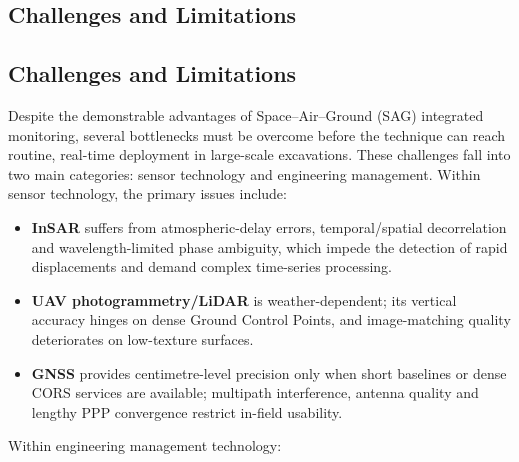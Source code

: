 \documentclass[preprint,11pt,authoryear,3p]{elsarticle}
\begin{document}
\subsection{Challenges and Limitations}

\subsection{Challenges and Limitations}\label{sec:challenges}

Despite the demonstrable advantages of Space--Air--Ground (SAG) integrated monitoring, several bottlenecks must be overcome before the technique can reach routine, real-time deployment in large-scale excavations. These challenges fall into two main categories: sensor technology and engineering management. Within sensor technology, the primary issues include:

\begin{itemize}
  \item \textbf{InSAR} suffers from atmospheric-delay errors, temporal/spatial decorrelation and wavelength-limited phase ambiguity, which impede the detection of rapid displacements and demand complex time-series processing.
  \item \textbf{UAV photogrammetry/LiDAR} is weather-dependent; its vertical accuracy hinges on dense Ground Control Points, and image-matching quality deteriorates on low-texture surfaces.
  \item \textbf{GNSS} provides centimetre-level precision only when short baselines or dense CORS services are available; multipath interference, antenna quality and lengthy PPP convergence restrict in-field usability.
\end{itemize}

Within engineering management technology:
\end{document}
